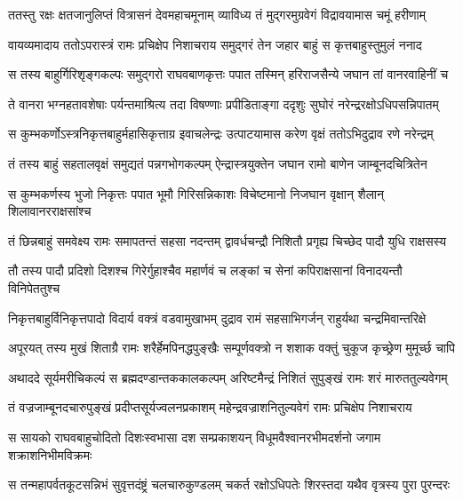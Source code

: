 \twolineshloka
{ततस्तु रक्षः क्षतजानुलिप्तं वित्रासनं देवमहाचमूनाम्}
{व्याविध्य तं मुद्गरमुग्रवेगं विद्रावयामास चमूं हरीणाम्} %

\twolineshloka
{वायव्यमादाय ततोऽपरास्त्रं रामः प्रचिक्षेप निशाचराय}
{समुद्गरं तेन जहार बाहुं स कृत्तबाहुस्तुमुलं ननाद} %

\twolineshloka
{स तस्य बाहुर्गिरिशृङ्गकल्पः समुद्गरो राघवबाणकृत्तः}
{पपात तस्मिन् हरिराजसैन्ये जघान तां वानरवाहिनीं च} %

\twolineshloka
{ते वानरा भग्नहतावशेषाः पर्यन्तमाश्रित्य तदा विषण्णाः}
{प्रपीडिताङ्गा ददृशुः सुघोरं नरेन्द्ररक्षोऽधिपसन्निपातम्} %

\twolineshloka
{स कुम्भकर्णोऽस्त्रनिकृत्तबाहुर्महासिकृत्ताग्र इवाचलेन्द्रः}
{उत्पाटयामास करेण वृक्षं ततोऽभिदुद्राव रणे नरेन्द्रम्} %

\twolineshloka
{तं तस्य बाहुं सहतालवृक्षं समुद्यतं पन्नगभोगकल्पम्}
{ऐन्द्रास्त्रयुक्तेन जघान रामो बाणेन जाम्बूनदचित्रितेन} %

\twolineshloka
{स कुम्भकर्णस्य भुजो निकृत्तः पपात भूमौ गिरिसन्निकाशः}
{विचेष्टमानो निजघान वृक्षान् शैलान् शिलावानरराक्षसांश्च} %

\twolineshloka
{तं छिन्नबाहुं समवेक्ष्य रामः समापतन्तं सहसा नदन्तम्}
{द्वावर्धचन्द्रौ निशितौ प्रगृह्य चिच्छेद पादौ युधि राक्षसस्य} %

\twolineshloka
{तौ तस्य पादौ प्रदिशो दिशश्च गिरेर्गुहाश्चैव महार्णवं च}
{लङ्कां च सेनां कपिराक्षसानां विनादयन्तौ विनिपेततुश्च} %

\twolineshloka
{निकृत्तबाहुर्विनिकृत्तपादो विदार्य वक्त्रं वडवामुखाभम्}
{दुद्राव रामं सहसाभिगर्जन् राहुर्यथा चन्द्रमिवान्तरिक्षे} %

\twolineshloka
{अपूरयत् तस्य मुखं शिताग्रै रामः शरैर्हेमपिनद्धपुङ्खैः}
{सम्पूर्णवक्त्रो न शशाक वक्तुं चुकूज कृच्छ्रेण मुमूर्च्छ चापि} %

\twolineshloka
{अथाददे सूर्यमरीचिकल्पं स ब्रह्मदण्डान्तककालकल्पम्}
{अरिष्टमैन्द्रं निशितं सुपुङ्खं रामः शरं मारुततुल्यवेगम्} %

\twolineshloka
{तं वज्रजाम्बूनदचारुपुङ्खं प्रदीप्तसूर्यज्वलनप्रकाशम्}
{महेन्द्रवज्राशनितुल्यवेगं रामः प्रचिक्षेप निशाचराय} %

\twolineshloka
{स सायको राघवबाहुचोदितो दिशःस्वभासा दश सम्प्रकाशयन्}
{विधूमवैश्वानरभीमदर्शनो जगाम शक्राशनिभीमविक्रमः} %

\twolineshloka
{स तन्महापर्वतकूटसन्निभं सुवृत्तदंष्ट्रं चलचारुकुण्डलम्}
{चकर्त रक्षोऽधिपतेः शिरस्तदा यथैव वृत्रस्य पुरा पुरन्दरः} %

